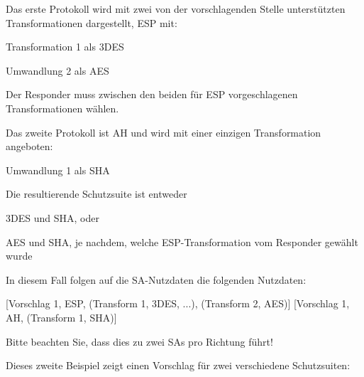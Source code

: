\documentclass[a4paper]{article}
\begin{document}
\begin{multicols}{3}
\begin{itemize*}
\begin{itemize*}
                  \begin{itemize*}
                        \item Das erste Protokoll wird mit zwei von der vorschlagenden Stelle unterstützten Transformationen dargestellt, ESP mit:
                        \begin{itemize*} \item Transformation 1 als 3DES \item Umwandlung 2 als AES \item Der Responder muss zwischen den beiden für ESP vorgeschlagenen Transformationen wählen. \end{itemize*}
                        \item Das zweite Protokoll ist AH und wird mit einer einzigen Transformation angeboten:
                        \begin{itemize*} \item Umwandlung 1 als SHA \end{itemize*}
                        \item Die resultierende Schutzsuite ist entweder
                        \begin{itemize*} \item 3DES und SHA, oder \item AES und SHA, je nachdem, welche ESP-Transformation vom Responder gewählt wurde \end{itemize*}
                        \item In diesem Fall folgen auf die SA-Nutzdaten die folgenden Nutzdaten:
                        \begin{itemize*} \item {[}Vorschlag 1, ESP, (Transform 1, 3DES, ...), (Transform 2, AES){]} {[}Vorschlag 1, AH, (Transform 1, SHA){]} \end{itemize*}
                        \item Bitte beachten Sie, dass dies zu zwei SAs pro Richtung führt!
                  \end{itemize*}
                  \item
                  Dieses zweite Beispiel zeigt einen Vorschlag für zwei verschiedene
                  Schutzsuiten:


\end{itemize*}
\end{itemize*}
\end{multicols}
\end{document}
